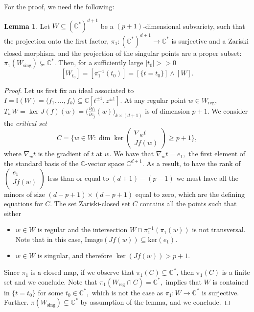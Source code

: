 \documentclass[11pt]{amsart}
\theoremstyle{definition}
\newtheorem{lemma}[theorem]{Lemma}
\newcommand{\lto}{\longrightarrow}
\newcommand{\C}{\mathbb{C}}
\begin{document}
For the proof, we need the following: 
\begin{lemma}\label{lem:trans}
Let $W\subseteq (\C^*)^{d+1}$ be a $(p+1)$-dimensional subvariety, such that the projection onto the first factor, $\pi_1:(\C^*)^{d+1} \longrightarrow \C^*  $ is surjective and a Zariski closed morphism, and the projection of the singular points are a proper subset: $\pi_1(W_{\text{sing}})\subsetneq \C^*$. Then, for a sufficiently large $|t_0|>>0$
$$
[W_{t_0}] = [\pi_{1}^{-1}(t_0)] = [\{t=t_0\}] \wedge [W].
$$
\end{lemma}
\begin{proof}
Let us first fix an ideal associated to $I = \mathbb{I}(W) = \langle f_1, \dots , f_k\rangle \subseteq \C[t^{\pm 1}, z^{\pm 1}].$ At any regular point $w\in W_{\text{reg}},$ $T_w W = \ker J(f)(w) = \big(\frac{\partial f_i}{\partial z_j}(w) \big)_{k\times (d+1)}$ is of dimension $p+1.$
We consider the \emph{critical set}
$$
C=\big\{w\in W: \dim \ker \begin{pmatrix}
\nabla_w t \\
Jf(w) 
\end{pmatrix} \geq p+1 \big\},
$$
where $\nabla_w t$ is the gradient of $t$ at $w$. We have that $\nabla_w t = e_1,$ the first element of the standard basis of the $\C$-vector space $\C^{d+1}.$ As a result, to have the rank of $\begin{pmatrix}
e_1 \\
Jf(w) 
\end{pmatrix}$ less than or equal to $(d+1)-(p-1)$ we must have all the minors of size $ (d-p+1)\times (d-p+1)$ equal to zero, which are the defining equations for $C.$  The set Zariski-closed set $C$ contains all the points such that either
\begin{itemize}
    \item $w \in W$ is regular and the intersection $W \cap \pi_{1}^{-1}(\pi_1(w))$ is not transversal. Note that in this case, $\text{Image}(Jf(w))\subseteq \text{ker}(e_1).$
   \item $w \in W$ is singular, and therefore $\ker (Jf(w)) > p+1.$
\end{itemize}
Since $\pi_1$ is a closed map, if we observe that $\pi_1(C) \subsetneq \C^*$, then $\pi_1(C)$ is a finite set and we conclude. Note that $\pi_1(W_{\text{reg}} \cap C) = \C^*,$ implies that $W$ is contained in $\{t=t_0 \}$ for some $t_0 \in \C^*,$ which is not the case as $\pi_1: W \lto \C^*$ is surjective. Further. $\pi(W_{\text{sing}}) \subsetneq \C^*$ by assumption of the lemma, and we conclude. %

\end{proof}
\end{document}
